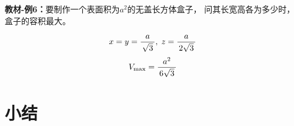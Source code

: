\begin{center}
\end{center}

{\bf 教材-例6：}要制作一个表面积为$a^2$的无盖长方体盒子，
问其长宽高各为多少时，盒子的容积最大。

$$x=y=\displaystyle\frac{\,{a}\,}{\,{\sqrt 3}\,},\;z=\displaystyle\frac{\,{a}\,}{\,{2\sqrt3}\,}$$
$$V_{\max}=\displaystyle\frac{\,{a^2}\,}{\,{6\sqrt 3}\,}$$

\section{小结}

